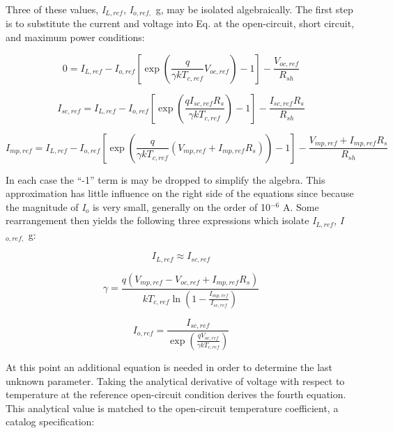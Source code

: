 Three of these values, \emph{I\(_{L,ref}\)}, \emph{I\(_{o,ref,}\)} g, may be isolated algebraically. The first step is to substitute the current and voltage into Eq. at the open-circuit, short circuit, and maximum power conditions:

\begin{equation}
0 = {I_{L,ref}} - {I_{o,ref}}\left[ {\exp \left( {\frac{q}{{\gamma k{T_{c,ref}}}}{V_{oc,ref}}} \right) - 1} \right] - \frac{{{V_{oc,ref}}}}{{{R_{sh}}}}
\end{equation}

\begin{equation}
{I_{sc,ref}} = {I_{L,ref}} - {I_{o,ref}}\left[ {\exp \left( {\frac{{q{I_{sc,ref}}{R_s}}}{{\gamma k{T_{c,ref}}}}} \right) - 1} \right] - \frac{{{I_{sc,ref}}{R_s}}}{{{R_{sh}}}}
\end{equation}

\begin{equation}
{I_{mp,ref}} = {I_{L,ref}} - {I_{o,ref}}\left[ {\exp \left( {\frac{q}{{\gamma k{T_{c,ref}}}}\left( {{V_{mp,ref}} + {I_{mp,ref}}{R_s}} \right)} \right) - 1} \right] - \frac{{{V_{mp,ref}} + {I_{mp,ref}}{R_s}}}{{{R_{sh}}}}
\end{equation}

In each case the ``-1'' term is may be dropped to simplify the algebra. This approximation has little influence on the right side of the equations since because the magnitude of \emph{I\(_{o}\)} is very small, generally on the order of 10\(^{-6}\) A. Some rearrangement then yields the following three expressions which isolate \emph{I\(_{L,ref}\)}, \emph{I\(_{o,ref,}\)} g:

\begin{equation}
{I_{L,ref}} \approx {I_{sc,ref}}
\end{equation}

\begin{equation}
\gamma  = \frac{{q\left( {{V_{mp,ref}} - {V_{oc,ref}} + I_{mp,ref}^{}{R_s}} \right)}}{{k{T_{c,ref}}\ln \left( {1 - \frac{{{I_{mp,ref}}}}{{{I_{sc,ref}}}}} \right)}}
\end{equation}

\begin{equation}
{I_{o,ref}} = \frac{{{I_{sc,ref}}}}{{\exp \left( {\frac{{q{V_{oc,ref}}}}{{\gamma k{T_{c,ref}}}}} \right)}}
\end{equation}

At this point an additional equation is needed in order to determine the last unknown parameter. Taking the analytical derivative of voltage with respect to temperature at the reference open-circuit condition derives the fourth equation. This analytical value is matched to the open-circuit temperature coefficient, a catalog specification:

